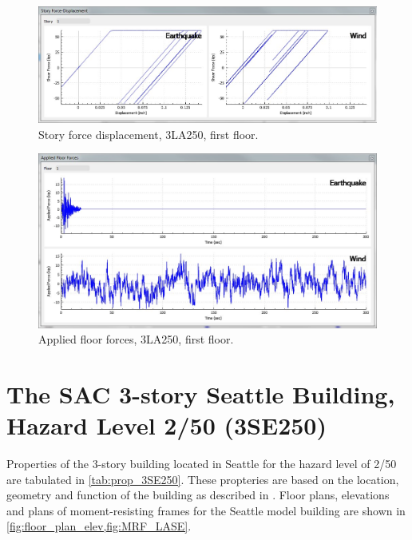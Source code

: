 \documentclass{simcenterdocumentation}
\begin{document}
\begin{figure}[H]
	\centering \includegraphics[scale=0.35]{3LA250_sfd.JPG}
	\caption{Story force displacement, 3LA250, first floor.}
\end{figure}
\begin{figure}[H]
	\centering \includegraphics[scale=0.35]{3LA250_aff.JPG}
	\caption{Applied floor forces, 3LA250, first floor.}
\end{figure}





\section{The SAC 3-story Seattle Building, Hazard Level 2/50 (3SE250)}
Properties of the 3-story building located in Seattle for the hazard level of 2/50 are tabulated in \cref{tab:prop_3SE250}. These propteries are based on the location, geometry and function of the building as described in \cite{FEMA335c2000}. Floor plans, elevations and plans of moment-resisting frames for the Seattle model building are shown in \cref{fig:floor_plan_elev,fig:MRF_LASE}.
\end{document}
